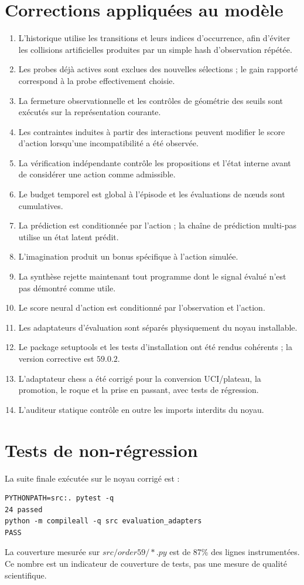 \documentclass[11pt,a4paper]{article}
\begin{document}
\section{Corrections appliquées au modèle}
\begin{enumerate}
\item L'historique utilise les transitions et leurs indices d'occurrence, afin d'éviter les collisions artificielles produites par un simple hash d'observation répétée.
\item Les probes déjà actives sont exclues des nouvelles sélections ; le gain rapporté correspond à la probe effectivement choisie.
\item La fermeture observationnelle et les contrôles de géométrie des seuils sont exécutés sur la représentation courante.
\item Les contraintes induites à partir des interactions peuvent modifier le score d'action lorsqu'une incompatibilité a été observée.
\item La vérification indépendante contrôle les propositions et l'état interne avant de considérer une action comme admissible.
\item Le budget temporel est global à l'épisode et les évaluations de nœuds sont cumulatives.
\item La prédiction est conditionnée par l'action ; la chaîne de prédiction multi-pas utilise un état latent prédit.
\item L'imagination produit un bonus spécifique à l'action simulée.
\item La synthèse rejette maintenant tout programme dont le signal évalué n'est pas démontré comme utile.
\item Le score neural d'action est conditionné par l'observation et l'action.
\item Les adaptateurs d'évaluation sont séparés physiquement du noyau installable.
\item Le package setuptools et les tests d'installation ont été rendus cohérents ; la version corrective est $59.0.2$.
\item L'adaptateur chess a été corrigé pour la conversion UCI/plateau, la promotion, le roque et la prise en passant, avec tests de régression.
\item L'auditeur statique contrôle en outre les imports interdits du noyau.
\end{enumerate}

\section{Tests de non-régression}
La suite finale exécutée sur le noyau corrigé est :
\begin{verbatim}
PYTHONPATH=src:. pytest -q
24 passed
python -m compileall -q src evaluation_adapters
PASS
\end{verbatim}
La couverture mesurée sur $src/order59/*.py$ est de 87\% des lignes instrumentées. Ce nombre est un indicateur de couverture de tests, pas une mesure de qualité scientifique.
\end{document}
